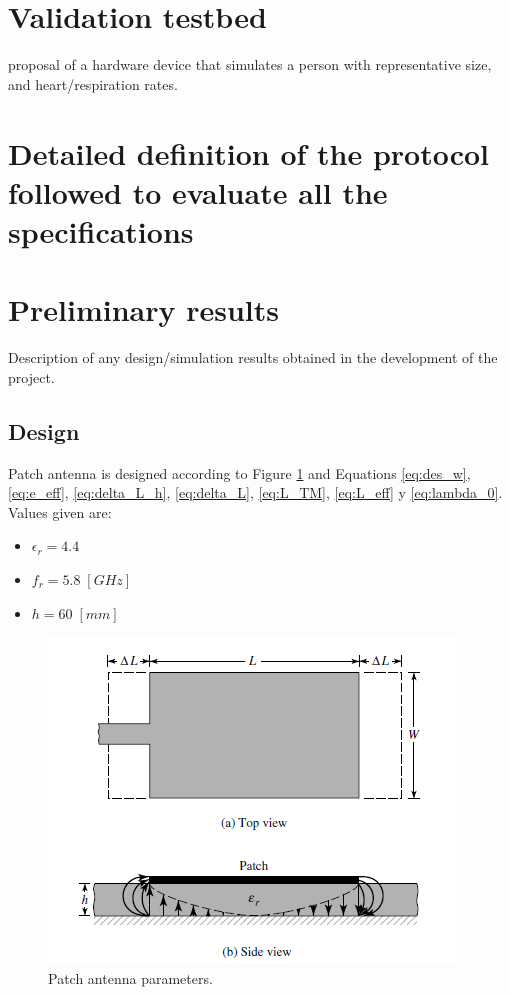 \documentclass[lettersize,journal]{IEEEtran}
\begin{document}
\section{Validation testbed}

proposal of a hardware device that simulates a person with representative size, and heart/respiration rates.

\section{Detailed definition of the protocol followed to evaluate all the specifications}



\section{Preliminary results}

Description of any design/simulation results obtained in the development of the project.

\subsection{Design}

Patch antenna is designed according to Figure \ref{fig:AntThe} and Equations \eqref{eq:des_w}, \eqref{eq:e_eff}, \eqref{eq:delta_L_h}, \eqref{eq:delta_L}, \eqref{eq:L_TM}, \eqref{eq:L_eff} y \eqref{eq:lambda_0}. Values given are:

\begin{itemize}
\item  $\epsilon_r=4.4$
\item $f_r=5.8 \; [GHz]$
\item $h=60 \; [mm]$

\end{itemize}


\begin{figure}[H]
\centering
\includegraphics[width=1\linewidth]{figs/AntThe.png}
\caption{Patch antenna parameters. \cite{balanisAntennaTheoryAnalysis2005}}
\label{fig:AntThe}
\end{figure}
\end{document}
